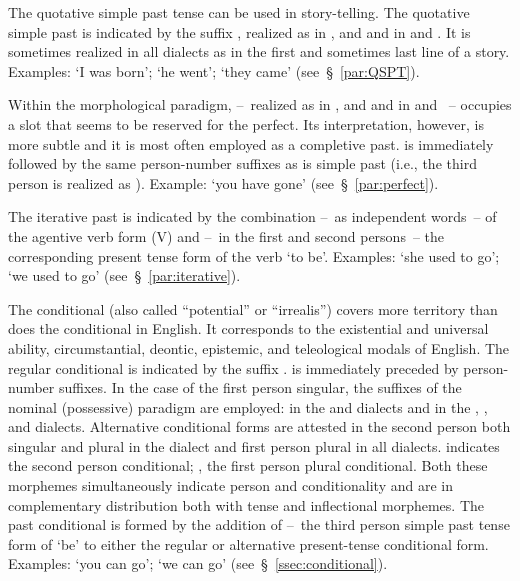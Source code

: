The quotative simple past tense can be used in story-telling. The quotative simple past is indicated by the suffix , realized as  in \ACH, \AMV{} and \SP{} and  in \CH{} and \LT. It is sometimes realized in all dialects as  in the first and sometimes last line of a story. Examples:  ‘I was born’;  ‘he went’;  ‘they came’ (see~§~\ref{par:QSPT}).

Within the morphological paradigm,  --~realized as  in \ACH, \AMV{} and \SP{} and  in \CH{} and \LT~-- occupies a slot that seems to be reserved for the perfect. Its interpretation, however, is more subtle and it is most often employed as a completive past.  is immediately followed by the same person-number suffixes as is simple past (i.e., the third person is realized as \phono{-\uo}). Example:  ‘you have gone’ (see~§~\ref{par:perfect}).

The iterative past is indicated by the combination --~as independent words~-- of the agentive verb form (V) and --~in the first and second persons~-- the corresponding present tense form of the verb  ‘to be’. Examples:  ‘she used to go’;  ‘we used to go’ (see~§~\ref{par:iterative}).

The conditional (also called “potential” or “irrealis”) covers more territory than does the conditional in English. It corresponds to the existential and universal ability, circumstantial, deontic, epistemic, and teleological modals of English. The regular conditional is indicated by the suffix .  is immediately preceded by person-number suffixes. In the case of the first person singular, the suffixes of the nominal (possessive) paradigm are employed:  in the \AMV{} and \LT{} dialects and \phono{-:} in the \ACH, \CH, and \SP{} dialects. Alternative conditional forms are attested in the second person both singular and plural in the \AMV{} dialect and first person plural in all dialects.  indicates the second person conditional; , the first person plural conditional. Both these morphemes simultaneously indicate person and conditionality and are in complementary distribution both with tense and inflectional morphemes. The past conditional is formed by the addition of  --~the third person simple past tense form of  ‘be’ to either the regular or alternative present-tense conditional form. Examples:  ‘you can go’;  ‘we can go’ (see~§~\ref{ssec:conditional}).

